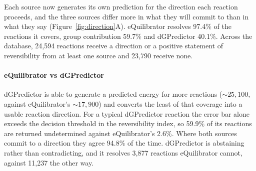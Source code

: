 \documentclass[unnumsec,webpdf,modern,large]{oup-authoring-template}
\begin{document}
Each source now generates its own prediction for the direction each reaction proceeds, and the three sources differ more in what they will commit to than in what they say (Figure~\ref{fig:direction}A). eQuilibrator resolves 97.4\% of the reactions it covers, group contribution 59.7\% and dGPredictor 40.1\%. Across the database, 24,594 reactions receive a direction or a positive statement of reversibility from at least one source and 23,790 receive none.

\paragraph{eQuilibrator vs dGPredictor} dGPredictor is able to generate a predicted energy for more reactions ($\sim25,100$, against eQuilibrator's $\sim17,900$) and converts the least of that coverage into a usable reaction direction. For a typical dGPredictor reaction the error bar alone exceeds the decision threshold in the reversibility index, so 59.9\% of its reactions are returned undetermined against eQuilibrator's 2.6\%. Where both sources commit to a direction they agree 94.8\% of the time. dGPredictor is abstaining rather than contradicting, and it resolves 3,877 reactions eQuilibrator cannot, against 11,237 the other way.
\end{document}
